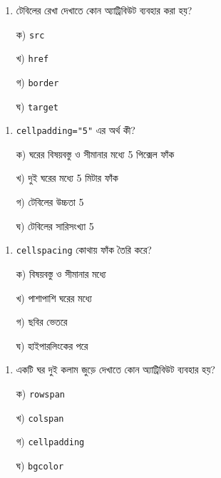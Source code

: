 \par
\par\addvspace{4pt}\noindent
\begin{minipage}[t]{.48\linewidth}\vspace{0pt}
\begin{enumerate}[start=5,leftmargin=*,topsep=0pt,itemsep=0pt]
\item টেবিলের রেখা দেখাতে কোন অ্যাট্রিবিউট ব্যবহার করা হয়?
\par ক) \texttt{src}
\par খ) \texttt{href}
\par গ) \texttt{border}
\par ঘ) \texttt{target}
\end{enumerate}
\end{minipage}\hfill
\begin{minipage}[t]{.48\linewidth}\vspace{0pt}
\begin{enumerate}[start=6,leftmargin=*,topsep=0pt,itemsep=0pt]
\item \texttt{cellpadding="5"} এর অর্থ কী?
\par ক) ঘরের বিষয়বস্তু ও সীমানার মধ্যে 5 পিক্সেল ফাঁক
\par খ) দুই ঘরের মধ্যে 5 মিটার ফাঁক
\par গ) টেবিলের উচ্চতা 5
\par ঘ) টেবিলের সারিসংখ্যা 5
\end{enumerate}
\end{minipage}
\par
\par\addvspace{4pt}\noindent
\begin{minipage}[t]{.48\linewidth}\vspace{0pt}
\begin{enumerate}[start=7,leftmargin=*,topsep=0pt,itemsep=0pt]
\item \texttt{cellspacing} কোথায় ফাঁক তৈরি করে?
\par ক) বিষয়বস্তু ও সীমানার মধ্যে
\par খ) পাশাপাশি ঘরের মধ্যে
\par গ) ছবির ভেতরে
\par ঘ) হাইপারলিংকের পরে
\end{enumerate}
\end{minipage}\hfill
\begin{minipage}[t]{.48\linewidth}\vspace{0pt}
\begin{enumerate}[start=8,leftmargin=*,topsep=0pt,itemsep=0pt]
\item একটি ঘর দুই কলাম জুড়ে দেখাতে কোন অ্যাট্রিবিউট ব্যবহার হয়?
\par ক) \texttt{rowspan}
\par খ) \texttt{colspan}
\par গ) \texttt{cellpadding}
\par ঘ) \texttt{bgcolor}
\end{enumerate}
\end{minipage}
